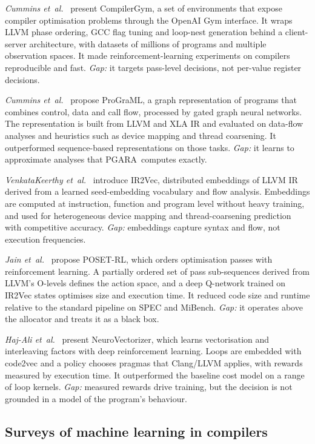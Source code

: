 \documentclass{ieeeaccess}
\newcommand{\MG}{PGARA}
\begin{document}
\textit{Cummins et~al.}~\cite{cummins2022compilergym} present
CompilerGym, a set of environments that expose compiler optimisation
problems through the OpenAI Gym interface. It wraps LLVM phase ordering,
GCC flag tuning and loop-nest generation behind a client-server
architecture, with datasets of millions of programs and multiple
observation spaces. It made reinforcement-learning experiments on
compilers reproducible and fast. \textit{Gap:} it targets pass-level
decisions, not per-value register decisions.

\textit{Cummins et~al.}~\cite{cummins2021programl} propose ProGraML, a
graph representation of programs that combines control, data and call
flow, processed by gated graph neural networks. The representation is
built from LLVM and XLA IR and evaluated on data-flow analyses and
heuristics such as device mapping and thread coarsening. It
outperformed sequence-based representations on those tasks.
\textit{Gap:} it learns to approximate analyses that \MG\ computes
exactly.

\textit{VenkataKeerthy et~al.}~\cite{venkatakeerthy2020ir2vec} introduce
IR2Vec, distributed embeddings of LLVM IR derived from a learned
seed-embedding vocabulary and flow analysis. Embeddings are computed at
instruction, function and program level without heavy training, and used
for heterogeneous device mapping and thread-coarsening prediction with
competitive accuracy. \textit{Gap:} embeddings capture syntax and flow,
not execution frequencies.

\textit{Jain et~al.}~\cite{jain2022posetrl} propose POSET-RL, which
orders optimisation passes with reinforcement learning. A partially
ordered set of pass sub-sequences derived from LLVM's O-levels defines
the action space, and a deep Q-network trained on IR2Vec states optimises
size and execution time. It reduced code size and runtime relative to
the standard pipeline on SPEC and MiBench. \textit{Gap:} it operates
above the allocator and treats it as a black box.

\textit{Haj-Ali et~al.}~\cite{hajali2020neurovectorizer} present
NeuroVectorizer, which learns vectorisation and interleaving factors
with deep reinforcement learning. Loops are embedded with code2vec and a
policy chooses pragmas that Clang/LLVM applies, with rewards measured by
execution time. It outperformed the baseline cost model on a range of
loop kernels. \textit{Gap:} measured rewards drive training, but the
decision is not grounded in a model of the program's behaviour.

\subsection{Surveys of machine learning in compilers}
\end{document}
